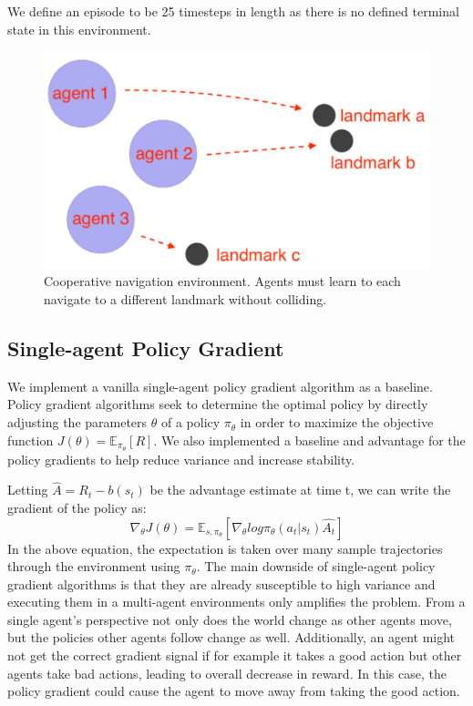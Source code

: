 \documentclass{article}
\begin{document}
We define an episode to be 25 timesteps in length as there is no defined terminal state in this environment.

\begin{figure}
\begin{center}
\includegraphics[scale=0.5]{env-image}
\end{center}
\caption{Cooperative navigation environment. Agents must learn to each navigate to a different landmark without colliding.}
\end{figure}

\subsection{Single-agent Policy Gradient}
We implement a vanilla single-agent policy gradient algorithm as a baseline. Policy gradient algorithms seek to determine the optimal policy by directly adjusting the parameters $\theta$ of a policy $\pi_\theta$ in order to maximize the objective function $J(\theta) = \mathbb{E}_{\pi_\theta}[R]$. We also implemented a baseline and advantage for the policy gradients to help reduce variance and increase stability.

Letting $\hat{A} = R_t - b(s_t)$ be the advantage estimate at time t, we can write the gradient of the policy as:
$$\nabla_\theta J(\theta) = \mathbb{E}_{s,\pi_\theta}[\nabla_\theta log \pi_\theta(a_t|s_t)\hat{A_t}]$$
In the above equation, the expectation is taken over many sample trajectories through the environment using $\pi_\theta$. The main downside of single-agent policy gradient algorithms is that they are already susceptible to  high variance and executing them in a multi-agent environments only amplifies the problem. From a single agent's perspective not only does the world change as other agents move, but the policies other agents follow change as well. Additionally, an agent might not get the correct gradient signal if for example it takes a good action but other agents take bad actions, leading to overall decrease in reward. In this case, the policy gradient could cause the agent to move away from taking the good action.
\end{document}
